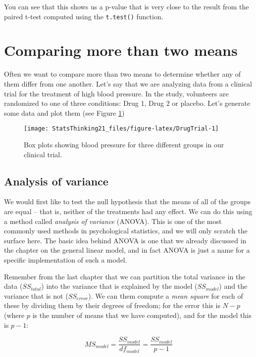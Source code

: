 \documentclass[]{book}
\theoremstyle{definition}
\theoremstyle{definition}
\theoremstyle{definition}
\theoremstyle{remark}
\begin{document}
You can see that this shows us a p-value that is very close to the
result from the paired t-test computed using the \texttt{t.test()}
function.

\section{Comparing more than two
means}\label{comparing-more-than-two-means}

Often we want to compare more than two means to determine whether any of
them differ from one another. Let's say that we are analyzing data from
a clinical trial for the treatment of high blood pressure. In the study,
volunteers are randomized to one of three conditions: Drug 1, Drug 2 or
placebo. Let's generate some data and plot them (see Figure
\ref{fig:DrugTrial})

\begin{figure}
\texttt{[image: StatsThinking21\_files/figure-latex/DrugTrial-1]} \caption{Box plots showing blood pressure for three different groups in our clinical trial.}\label{fig:DrugTrial}
\end{figure}

\subsection{Analysis of variance}\label{analysis-of-variance}

We would first like to test the null hypothesis that the means of all of
the groups are equal -- that is, neither of the treatments had any
effect. We can do this using a method called \emph{analysis of variance}
(ANOVA). This is one of the most commonly used methods in psychological
statistics, and we will only scratch the surface here. The basic idea
behind ANOVA is one that we already discussed in the chapter on the
general linear model, and in fact ANOVA is just a name for a specific
implementation of such a model.

Remember from the last chapter that we can partition the total variance
in the data (\(SS_{total}\)) into the variance that is explained by the
model (\(SS_{model}\)) and the variance that is not (\(SS_{error}\)). We
can them compute a \emph{mean square} for each of these by dividing them
by their degrees of freedom; for the error this is \(N - p\) (where
\(p\) is the number of means that we have computed), and for the model
this is \(p - 1\):

\[
MS_{model} =\frac{SS_{model}}{df_{model}}= \frac{SS_{model}}{p-1}
\]
\end{document}
